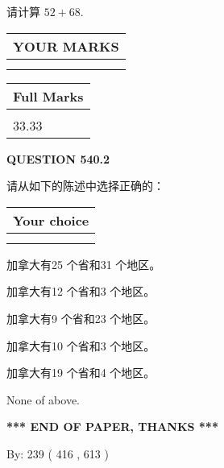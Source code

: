 \documentclass{ctexart}
\begin{document}
  
 
请计算 $ %
52 +  %
68 $.
 

 

 
  
\vspace{0.2in}
  
\noindent\begin{tabular}{|l|}
\hline
 YOUR MARKS  \\
\hline
 \\ 
 \\ 
\hline
\end{tabular}
\hspace{0.05in} \begin{tabular}{|l|}
\hline
 Full Marks  \\
\hline
 \\ 
33.33 \\
\hline
\end{tabular}
{\textbf{\Large{QUESTION
540.2 
}}}
  
  
请从如下的陈述中选择正确的：
  
  
\noindent\hspace{3.0in} \begin{tabular}{|l|}
\hline
Your choice \\
\hline
 \\ 
 \\ 
\hline
\end{tabular}
  
  
 
 
加拿大有25 个省和31 个地区。
 
 
加拿大有12 个省和3 个地区。
 
 
加拿大有9 个省和23 个地区。
 
 
加拿大有10 个省和3 个地区。
 
 
加拿大有19 个省和4 个地区。
 
 
 None of above.
 
 
   
   
 \vspace{0.2in}
 
   
   
   
   
\vspace{1.0in} 
{\textbf{\large{ *** END OF PAPER, THANKS *** }}} 
   
   
\hspace{1.0in} By: 
 239 ( 416 ,  613 )
   
\end{document}
